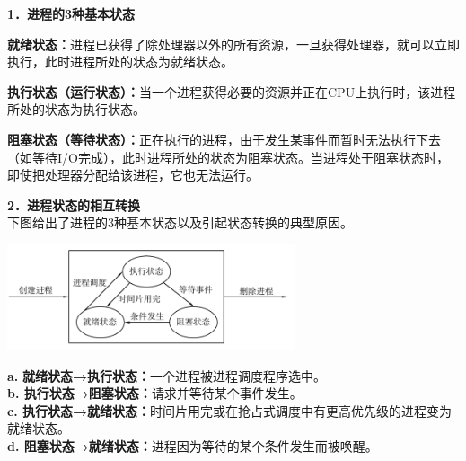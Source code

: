 \textbf{{1．进程的3种基本状态}}

\textbf{就绪状态：}进程已获得了除处理器以外的所有资源，一旦获得处理器，就可以立即执行，此时进程所处的状态为就绪状态。

\textbf{执行状态（运行状态）：}当一个进程获得必要的资源并正在CPU上执行时，该进程所处的状态为执行状态。

\textbf{阻塞状态（等待状态）：}正在执行的进程，由于发生某事件而暂时无法执行下去（如等待I/O完成），此时进程所处的状态为阻塞状态。当进程处于阻塞状态时，即使把处理器分配给该进程，它也无法运行。

\textbf{{2．进程状态的相互转换}}\\

下图给出了进程的3种基本状态以及引起状态转换的典型原因。

\includegraphics[width=3.33333in,height=1.22917in]{png-jpeg-pics/57AEB4CE7E8D38FE0EB467C74A138DAF.png}

\textbf{a.} \textbf{就绪状态→执行状态：}一个进程被进程调度程序选中。\\
\textbf{b. 执行状态→阻塞状态：}请求并等待某个事件发生。\\
\textbf{c.
执行状态→就绪状态：}时间片用完或在抢占式调度中有更高优先级的进程变为就绪状态。\\
\textbf{d. 阻塞状态→就绪状态：}进程因为等待的某个条件发生而被唤醒。
